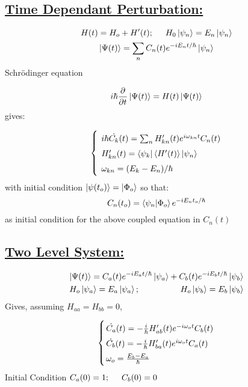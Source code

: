 \newpage
\subsection*{\underline{Time Dependant Perturbation:}}

\begin{gather}
	H(t) = H_o +H'(t); \hspace{0.5 cm} H_0\ket{\psi_n} = E_n\ket{\psi_n}\\
	\ket{\Psi(t)} = \sum_n{C_n(t) e^{-iE_nt/\hbar}}\ket{\psi_n}
\end{gather}
Schrödinger equation

\begin{equation}
	i\hbar\frac{\partial}{\partial t}\ket{\Psi(t)} = H(t)\ket{\Psi(t)}
\end{equation}
gives:

\begin{equation}
	\left\{ \arraycolsep=1.4pt\def\arraystretch{1.5}
	\begin{array}{ll}
			\;i\hbar\dot{C_k} (t) =  \sum_n{H'_{kn}(t)e^{i\omega_{kn}t}C_n(t)}\\
			\;H'_{kn}(t) = \bra{\psi_k}\expval{H'(t)}\ket{\psi_n}\\
			\;\omega_{kn} = (E_k-E_n)/\hbar\\
	\end{array} \right.
\end{equation}
with initial condition $\ket{\psi(t_o)} = \ket{\Phi_o}$ so that:
\begin{equation}
	C_n(t_o) = \bra{\psi_n}\ket{\Phi_o}e^{-iE_nt_o/\hbar}
\end{equation}
as initial condition for the above coupled equation in $C_n(t)$

\subsection*{\underline{Two Level System:}}
\begin{gather}
	\ket{\Psi(t)} = C_a(t)e^{-iE_at/\hbar}\ket{\psi_a} + C_b(t)e^{-iE_bt/\hbar}\ket{\psi_b}\\
	H_o\ket{\psi_a} = E_a\ket{\psi_a}; \hspace{1.7 cm} H_o\ket{\psi_b} = E_b\ket{\psi_b}
\end{gather}
Gives, assuming $H_{aa} = H_{bb} = 0$,

\begin{equation}
	\left\{ \arraycolsep=1.4pt\def\arraystretch{1.5}
 	\begin{array}{ll}
			\dot{C_a} (t) =  -\frac{i}{\hbar}H'_{ab}(t)e^{-i\omega_{o}t}C_b(t)\\ 
			\dot{C_b} (t) =  -\frac{i}{\hbar}H'_{ba}(t)e^{i\omega_{o}t}C_a(t)\\
			\omega_o = \frac{E_b-E_a}{\hbar}
	\end{array} \right.
\end{equation}
Initial Condition $C_a(0) = 1; \hspace{0.5 cm} C_b(0)=0$

